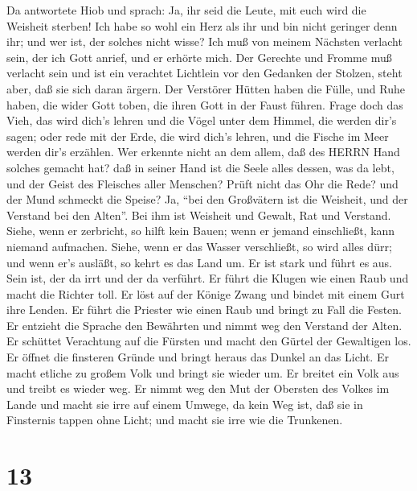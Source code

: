  Da antwortete Hiob und sprach:  Ja, ihr seid
die Leute, mit euch wird die Weisheit sterben!  Ich habe so
wohl ein Herz als ihr und bin nicht geringer denn ihr; und wer ist, der
solches nicht wisse?  Ich muß von meinem Nächsten verlacht
sein, der ich Gott anrief, und er erhörte mich. Der Gerechte und Fromme
muß verlacht sein  und ist ein verachtet Lichtlein vor den
Gedanken der Stolzen, steht aber, daß sie sich daran ärgern.
 Der Verstörer Hütten haben die Fülle, und Ruhe haben, die
wider Gott toben, die ihren Gott in der Faust führen.  Frage
doch das Vieh, das wird dich's lehren und die Vögel unter dem Himmel,
die werden dir's sagen;  oder rede mit der Erde, die wird
dich's lehren, und die Fische im Meer werden dir's erzählen.
 Wer erkennte nicht an dem allem, daß des HERRN Hand solches
gemacht hat?  daß in seiner Hand ist die Seele alles
dessen, was da lebt, und der Geist des Fleisches aller Menschen?
 Prüft nicht das Ohr die Rede? und der Mund schmeckt die
Speise?  Ja, ``bei den Großvätern ist die Weisheit, und der
Verstand bei den Alten''.  Bei ihm ist Weisheit und Gewalt,
Rat und Verstand.  Siehe, wenn er zerbricht, so hilft kein
Bauen; wenn er jemand einschließt, kann niemand aufmachen. 
Siehe, wenn er das Wasser verschließt, so wird alles dürr; und wenn er's
ausläßt, so kehrt es das Land um.  Er ist stark und führt
es aus. Sein ist, der da irrt und der da verführt.  Er
führt die Klugen wie einen Raub und macht die Richter toll.
 Er löst auf der Könige Zwang und bindet mit einem Gurt
ihre Lenden.  Er führt die Priester wie einen Raub und
bringt zu Fall die Festen.  Er entzieht die Sprache den
Bewährten und nimmt weg den Verstand der Alten.  Er
schüttet Verachtung auf die Fürsten und macht den Gürtel der Gewaltigen
los.  Er öffnet die finsteren Gründe und bringt heraus das
Dunkel an das Licht.  Er macht etliche zu großem Volk und
bringt sie wieder um. Er breitet ein Volk aus und treibt es wieder weg.
 Er nimmt weg den Mut der Obersten des Volkes im Lande und
macht sie irre auf einem Umwege, da kein Weg ist,  daß sie
in Finsternis tappen ohne Licht; und macht sie irre wie die Trunkenen.

\hypertarget{section-12}{%
\section{13}\label{section-12}}

